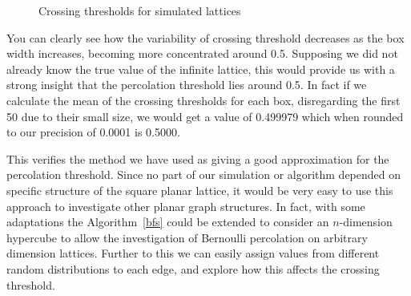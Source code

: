 \documentclass[a4paper,11pt]{article}
\theoremstyle{definition}
\begin{document}
\begin{landscape}
	\begin{figure}
		\centering
		\caption{Crossing thresholds for simulated lattices}
		\label{fig:thresholdplot2}
	\end{figure}
	\end{landscape}

You can clearly see how the variability of crossing threshold decreases as the box width increases, becoming more concentrated around 0.5. Supposing we did not already know the true value of the infinite lattice, this would provide us with a strong insight that the percolation threshold lies around 0.5. In fact if we calculate the mean of the crossing thresholds for each box, disregarding the first 50 due to their small size, we would get a value of 0.499979 which when rounded to our precision of 0.0001 is 0.5000.

This verifies the method we have used as giving a good approximation for the percolation threshold. Since no part of our simulation or algorithm depended on specific structure of the square planar lattice, it would be very easy to use this approach to investigate other planar graph structures. In fact, with some adaptations the Algorithm~\ref*{bfs} could be extended to consider an $n$-dimension hypercube to allow the investigation of Bernoulli percolation on arbitrary dimension lattices. Further to this we can easily assign values from different random distributions to each edge, and explore how this affects the crossing threshold.

\end{document}
